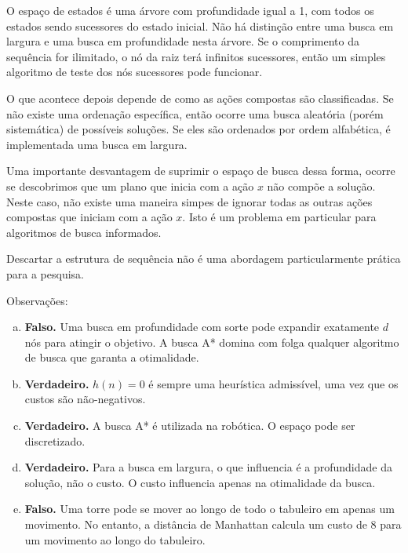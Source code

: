 \begin{solution}
O espaço de estados é uma árvore com profundidade igual a 1, com todos os estados sendo sucessores do estado inicial. Não há distinção entre uma busca em largura e uma busca em profundidade nesta árvore. Se o comprimento da sequência for ilimitado, o nó da raiz terá infinitos sucessores, então um simples algoritmo de teste dos nós sucessores pode funcionar.

O que acontece depois depende de como as ações compostas são classificadas. Se não existe uma ordenação específica, então ocorre uma busca aleatória (porém sistemática) de possíveis soluções. Se eles são ordenados por ordem alfabética, é implementada uma busca em largura.

Uma importante desvantagem de suprimir o espaço de busca dessa forma, ocorre se descobrimos que um plano que inicia com a ação $x$ não compõe a solução. Neste caso, não existe uma maneira simpes de ignorar todas as outras ações compostas que iniciam com a ação $x$. Isto é um problema em particular para algoritmos de busca informados.

Descartar a estrutura de sequência não é uma abordagem particularmente prática para a pesquisa.
\end{solution}

\begin{solution}
Observações:
\begin{enumerate}[a.]
	\item \textbf{Falso.} Uma busca em profundidade com sorte pode expandir exatamente $d$ nós para atingir o objetivo. A busca A* domina com folga qualquer algoritmo de busca que garanta a otimalidade.
	
	\item \textbf{Verdadeiro.} $h(n) = 0$ é sempre uma heurística admissível, uma vez que os custos são não-negativos.
	
	\item \textbf{Verdadeiro.} A busca A* é utilizada na robótica. O espaço pode ser discretizado. 
	
	\item \textbf{Verdadeiro.} Para a busca em largura, o que influencia é a profundidade da solução, não o custo. O custo influencia apenas na otimalidade da busca.
	
	\item \textbf{Falso.} Uma torre pode se mover ao longo de todo o tabuleiro em apenas um movimento. No entanto, a distância de Manhattan calcula um custo de 8 para um movimento ao longo do tabuleiro.
\end{enumerate}
\end{solution}

